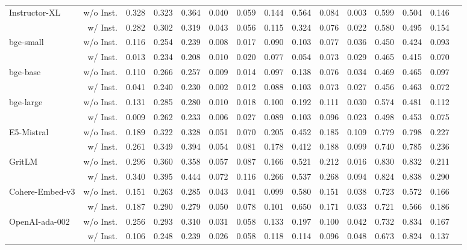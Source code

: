 \begin{table}[!htp]
{\begin{tabular}{lr|rcccccccccc|cc}
\multirow{2}{*}{Instructor-XL} &w/o Inst. &0.328 &0.323 &0.364 &0.040 &0.059 &0.144 &0.564 &0.084 &0.003 &0.599 &0.504&0.146\\
&w/ Inst. &0.282 &0.302 &0.319 &0.043 &0.056 &0.115 &0.324 &0.076 &0.022 &0.580 &0.495 &0.154\\
\multirow{2}{*}{bge-small} &w/o Inst. &0.116 &0.254 &0.239 &0.008 &0.017 &0.090 &0.103 &0.077 &0.036 &0.450 &0.424 &0.093\\
&w/ Inst. &0.013 &0.234 &0.208 &0.010 &0.020 &0.077 &0.054 &0.073 &0.029 &0.465 &0.415 &0.070\\
\multirow{2}{*}{bge-base} &w/o Inst. &0.110 &0.266 &0.257 &0.009 &0.014 &0.097 &0.138 &0.076 &0.034 &0.469 &0.465 &0.097\\
&w/ Inst. &0.041 &0.240 &0.230 &0.002 &0.012 &0.088 &0.103 &0.073 &0.027 &0.456 &0.463 &0.072\\
\multirow{2}{*}{bge-large} &w/o Inst. &0.131 &0.285 &0.280 &0.010 &0.018 &0.100 &0.192 &0.111 &0.030 &0.574 &0.481 &0.112\\
&w/ Inst. &0.009 &0.262 &0.233 &0.006 &0.027 &0.089 &0.103 &0.096 &0.023 &0.498 &0.453 &0.075\\

\multirow{2}{*}{E5-Mistral} & w/o Inst.	& 0.189	& 0.322	& 0.328	& 0.051	& 0.070 & 0.205 & 0.452 & 0.185 & 0.109 & 0.779 & 0.798&0.227\\
 & w/ Inst. & 0.261 & 0.349 & 0.394 & 0.054 & 0.081 & 0.178 & 0.412 & 0.188 & 0.099 & 0.740 & 0.785&0.236\\

\multirow{2}{*}{GritLM} & w/o Inst.	& 0.296 & 0.360 & 0.358 & 0.057 & 0.087 & 0.166 & 0.521 & 0.212 & 0.016 & 0.830 & 0.832 & 0.211\\
 & w/ Inst. & 0.340 & 0.395 & 0.444 & 0.072 & 0.116 & 0.266 & 0.537 & 0.268 & 0.094 & 0.824 & 0.838 & 0.290\\
 
\midrule[0.5pt]\midrule[0.5pt]
\multirow{2}{*}{Cohere-Embed-v3} & w/o Inst. & 0.151 & 0.263 & 0.285 & 0.043 & 0.041 & 0.099 & 0.580 & 0.151 & 0.038 & 0.723 & 0.572&0.166\\
 & w/ Inst. & 0.187 & 0.290 & 0.279 & 0.050 & 0.078 & 0.101 & 0.650 & 0.171 & 0.033 & 0.721 & 0.566 &0.186\\

\multirow{2}{*}{OpenAI-ada-002} &w/o Inst. &0.256 &0.293 &0.310 &0.031 &0.058 &0.133 &0.197 & 0.100 &0.042 & 0.732& 0.834 &0.167\\
&w/ Inst. &0.106 &0.248 &0.239 &0.026 &0.058 &0.118 &0.114 &0.096 &0.048 &0.673 & 0.824 &0.137\\


\end{tabular}}
\end{table}
